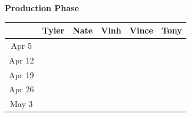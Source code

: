 \documentclass{extarticle}
\begin{document}
\begin{center}
\bf{Production Phase}
\begin{table}[H]
\begin{tabular}{ c || p{3cm} | p{3cm} | p{3cm} | p{3cm} | p{3cm} |}
 & \bf{Tyler} & \bf{Nate} & \bf{Vinh} & \bf{Vince} & \bf{Tony} \\ \hline
Apr 5  &          &            &            &              &            \\ \hline
Apr 12 &          &            &            &              &            \\ \hline
Apr 19 &          &            &            &              &            \\ \hline
Apr 26 &          &            &            &              &            \\ \hline
May 3  &          &            &            &              &            \\ \hline
\end{tabular}
\end{table}
\end{center}

\newpage
\end{document}
